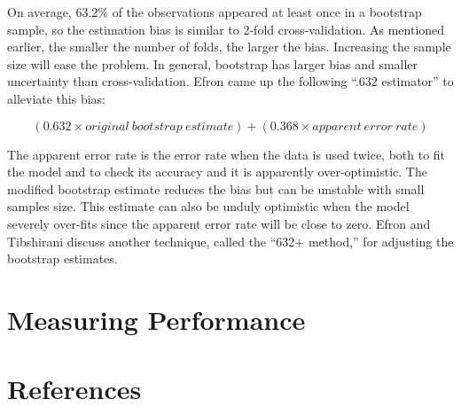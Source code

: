 \documentclass[12pt,]{krantz}
\theoremstyle{definition}
\theoremstyle{definition}
\theoremstyle{remark}
\begin{document}
On average, 63.2\% of the observations appeared at least once in a
bootstrap sample, so the estimation bias is similar to 2-fold
cross-validation. As mentioned earlier, the smaller the number of folds,
the larger the bias. Increasing the sample size will ease the problem.
In general, bootstrap has larger bias and smaller uncertainty than
cross-validation. Efron came up the following ``.632 estimator'' to
alleviate this bias:

\[(0.632 × original\ bootstrap\ estimate) + (0.368 × apparent\ error\ rate)\]

The apparent error rate is the error rate when the data is used twice,
both to fit the model and to check its accuracy and it is apparently
over-optimistic. The modified bootstrap estimate reduces the bias but
can be unstable with small samples size. This estimate can also be
unduly optimistic when the model severely over-fits since the apparent
error rate will be close to zero. Efron and Tibshirani \citep{b632plus}
discuss another technique, called the ``632+ method,'' for adjusting the
bootstrap estimates.

\chapter{Measuring Performance}\label{measuring-performance}

\chapter{References}\label{references}



\backmatter
\printindex
\end{document}
